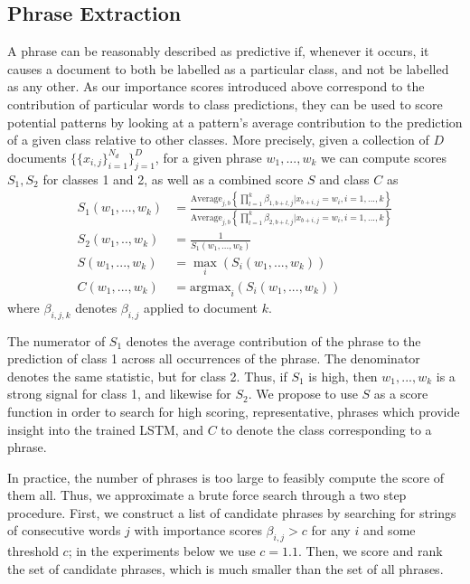 \documentclass{article}
\begin{document}
\subsection{Phrase Extraction}
\label{sec:phrase_extraction}
A phrase can be reasonably described as predictive if, whenever it occurs, it causes a document to both be labelled as a particular class, and not be labelled as any other. As our importance scores introduced above correspond to the contribution of particular words to class predictions, they can be used to score potential patterns by looking at a pattern's average contribution to the prediction of a given class relative to other classes. More precisely, given a collection of $D$ documents $\{\{x_{i,j}\}_{i = 1}^ {N_d} \}_{j=1}^D$, for a given phrase $w_1,...,w_k$ we can compute scores $S_1, S_2$ for classes 1 and 2, as well as a combined score $S$ and class $C$ as
\begin{align}
S_1(w_1,...,w_k) & =  \frac{\text{Average}_{j,b}\left\lbrace \prod_{l=1}^k \beta_{1, b + l, j} | x_{b + i, j} = w_i, i = 1,...,k  \right\rbrace}{\text{Average}_{j,b}\left\lbrace \prod_{l=1}^k \beta_{2, b + l, j} | x_{b + i, j} = w_i, i = 1,...,k  \right\rbrace} \\
S_2(w_1,..,w_k) & = \frac{1}{S_1(w_1,...,w_k)} \\
S(w_1,...,w_k) & = \max_i(S_i(w_1,...,w_k))\\
C(w_1,...,w_k) & = \text{argmax}_i(S_i(w_1,...,w_k))
\end{align}
where $\beta_{i, j, k}$ denotes $\beta_{i, j}$ applied to document $k$. 

The numerator of $S_1$ denotes the average contribution of the phrase to the prediction of class 1 across all occurrences of the phrase. The denominator denotes the same statistic, but for class 2. Thus, if $S_1$ is high, then $w_1,...,w_k$ is a strong signal for class 1, and likewise for $S_2$. We propose to use $S$ as a score function in order to search for high scoring, representative, phrases which provide insight into the trained LSTM, and $C$ to denote the class corresponding to a phrase.

In practice, the number of phrases is too large to feasibly compute the score of them all. Thus, we approximate a brute force search through a two step procedure. First, we construct a list of candidate phrases by searching for strings of consecutive words $j$ with importance scores $\beta_{i,j} > c$ for any $i$ and some threshold $c$; in the experiments below we use $c=1.1$. Then, we score and rank the set of candidate phrases, which is much smaller than the set of all phrases. 
\end{document}
